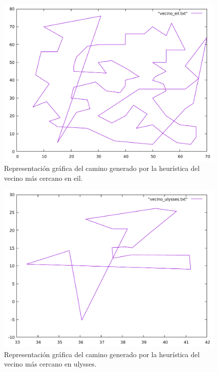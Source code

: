 \begin{figure}[H]
  \centering
  \includegraphics[scale=0.5]{../src/vecino_eil.pdf}
  \caption{Representación gráfica del camino generado por la heurística del vecino más cercano en eil.}
\end{figure} 

\begin{figure}[H]
  \centering
  \includegraphics[scale=0.5]{../src/vecino_ulysses.pdf}
  \caption{Representación gráfica del camino generado por la heurística del vecino más cercano en ulysses.}
\end{figure} 

